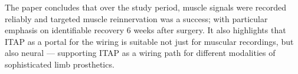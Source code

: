 The paper concludes that over the study period, muscle signals were recorded reliably and targeted muscle reinnervation was a success; with particular emphasis on identifiable recovery 6 weeks after surgery.
It also highlights that ITAP as a portal for the wiring is suitable not just for muscular recordings, but also neural --- supporting ITAP as a wiring path for different modalities of sophisticated limb prosthetics. 